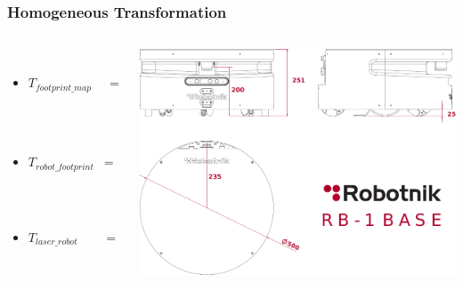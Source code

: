 	\begin{frame}
		\frametitle{Homogeneous Transformation}
		\begin{columns}[T]
			\begin{column}{0.49\textwidth}
				\begin{itemize}
					\item $
					T_{footprint\_map} \enspace \text{ }=
					\begin{pmatrix}
						\cos\theta_r & -\sin\theta_r & 0 & x_{r} \\
						\sin\theta_r & \cos\theta_r & 0 & y_{r} \\
						0 & 0 & 1 & 0 \\
						0 & 0 & 0 & 1 \\
					\end{pmatrix}
					$
					\item $
					T_{robot\_footprint} \enspace= 
					\begin{pmatrix}
						1 & 0 & 0 & 0 \\
						0 & 1 & 0 & 0 \\
						0 & 0 & 1 & -0.125 \\
						0 & 0 & 0 & 1 \\
					\end{pmatrix}
					$
					\item $
					T_{laser\_robot} \qquad= 
					\begin{pmatrix}
						1 & 0 & 0 & 0 \\
						0 & 1 & 0 & -0.245 \\
						0 & 0 & 1 & -0.051 \\
						0 & 0 & 0 & 1 \\
					\end{pmatrix}
					$
				\end{itemize}
			\end{column}
			\begin{column}{0.49\textwidth}
				\centering
				\includegraphics[scale=0.5]{pictures/robotnik.pdf}
			\end{column}
		\end{columns}
	\end{frame}

